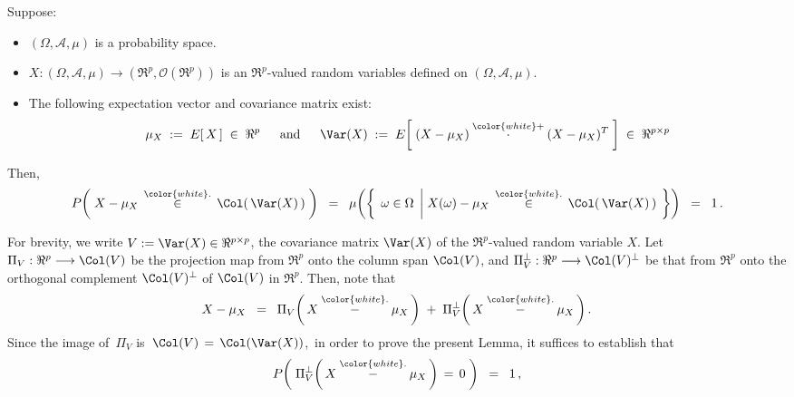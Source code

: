 
\begin{lemma}\label{XminusMuXLiesInColVarX}
\mbox{}\vskip 0.1cm
\noindent
Suppose:
\begin{itemize}
\item
	$(\Omega,\mathcal{A},\mu)$ is a probability space.
\item
	$X : (\Omega,\mathcal{A},\mu) \longrightarrow (\Re^{p},\mathcal{O}(\Re^{p}))$
	is an $\Re^{p}$-valued random variables defined on $(\Omega,\mathcal{A},\mu)$.
\item
	The following expectation vector and covariance matrix exist:
	\begin{equation*}
	\mu_{X} \;:=\; E\!\left[\,X\,\right] \;\in\; \Re^{p}
	\quad\;\;\textnormal{and}\quad\;\;
	\Var\!\left(X\right)
		\;:=\; E\!\left[\;(X-\mu_{X}) \overset{{\color{white}+}}{\cdot} (X-\mu_{X})^{T}\;\right]
		\;\in\; \Re^{p \times p}
	\end{equation*}
\end{itemize}
Then,
\begin{equation*}
P\!\left(\; X - \mu_{X} \,\overset{{\color{white}.}}{\in}\, \Col\!\left(\,\Var(X)\,\right)\;\right)
\;\; = \;\;
	\mu\!\left(\left\{\;\,
		\omega \in \Omega
		\;\left\vert\;
		X(\omega) - \mu_{X} \,\overset{{\color{white}.}}{\in}\, \Col\!\left(\,\Var(X)\,\right)
		\right.
		\;\right\}\right)
\;\; = \;\; 1\,.
\end{equation*}
\end{lemma}
\proof
For brevity, we write $V := \Var(X) \in \Re^{p \times p}$,
the covariance matrix $\Var(X)$ of the $\Re^{p}$-valued random variable $X$.
Let $\Pi_{V} : \Re^{p} \longrightarrow \Col(V)$ be the projection map from $\Re^{p}$ onto the column span $\Col(V)$,
and $\Pi^{\perp}_{V} : \Re^{p} \longrightarrow \Col(V)^{\perp}$ be that from $\Re^{p}$ onto the orthogonal
complement $\Col(V)^{\perp}$ of $\Col(V)$ in $\Re^{p}$.
Then, note that
\begin{equation*}
X - \mu_{X}
\;\; = \;\;
	\Pi_{V}\!\left(\,X \overset{{\color{white}.}}{-} \mu_{X}\,\right)
	\;+\;
	\Pi^{\perp}_{V}\!\left(\,X \overset{{\color{white}.}}{-} \mu_{X}\,\right).
\end{equation*}
Since the image of \,$\Pi_{V}$ is \,$\Col(V)\,=\,\Col(\Var(X))$,\,
in order to prove the present Lemma, it suffices to establish that
\begin{equation*}
P\!\left(\;\Pi^{\perp}_{V}\!\left(\,X \overset{{\color{white}.}}{-} \mu_{X}\,\right) \,=\, 0 \;\right)
\;\;=\;\; 1 \,,
\end{equation*}

